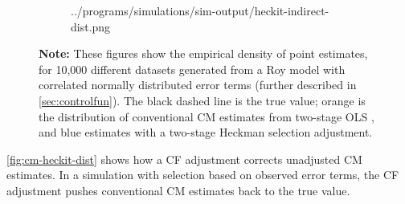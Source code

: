 \begin{figure}[h!]
\begin{subfigure}[c]{0.475\textwidth}
{            ../programs/simulations/sim-output/heckit-indirect-dist.png}
    \end{subfigure}
    \label{fig:cm-heckit-dist}
    \justify
    \footnotesize    
    \textbf{Note:}
    These figures show the empirical density of point estimates, for 10,000 different datasets generated from a Roy model with correlated normally distributed error terms (further described in \autoref{sec:controlfun}).
    The black dashed line is the true value;
    orange is the distribution of conventional CM estimates from two-stage OLS \citep{imai2010identification},
    and blue estimates with a two-stage Heckman selection adjustment.
\end{figure}

\autoref{fig:cm-heckit-dist} shows how a CF adjustment corrects unadjusted CM estimates.
In a simulation with selection based on observed error terms, the CF adjustment pushes conventional CM estimates back to the true value. 
